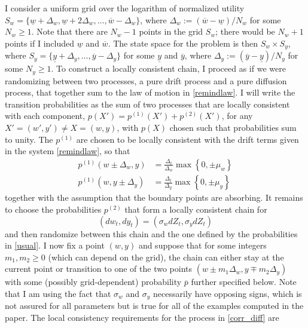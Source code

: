 \documentclass[11pt]{article}
\theoremstyle{plain}
\begin{document}

I consider a uniform grid over the logarithm of normalized utility $S_w = \{\underline{w} + \Delta_w, \underline{w} + 2\Delta_w, \dots, \overline{w} - \Delta_w\}$, where $\Delta_w := (\overline{w} - \underline{w})/N_w$ for some $N_w \geq 1$. Note that there are $N_w-1$ points in the grid $S_w$; there would be $N_w+1$ points if I included $\underline{w}$ and $\overline{w}$.
The state space for the problem is then $S_w \times S_y$, where $S_y = \{\underline{y} + \Delta_y, \dots, \overline{y} - \Delta_y\}$ for some $\underline{y}$ and $\overline{y}$, where $\Delta_y := (\overline{y} - \underline{y})/N_y$ for some $N_y \geq 1$. To construct a locally consistent chain, I proceed as if we were randomizing between two processes, a pure drift process and a pure diffusion process, that together sum to the law of motion in \eqref{remindlaw}. I will write the transition probabilities as the sum of two processes that are locally consistent with each component, $p(X') = p^{(1)}(X') + p^{(2)}(X')$, for any $X' = (w',y') \neq X = (w,y)$, with $p(X)$ chosen such that probabilities sum to unity. The $p^{(1)}$ are chosen to be locally consistent with the drift terms given in the system \eqref{remindlaw}, so that
\begin{equation}
\begin{aligned} 
p^{(1)}(w \pm \Delta_w, y) & = \frac{\Delta_t}{\Delta_w} \max{\left\{0, \pm \mu_w \right\}}
\\ p^{(1)}(w, y \pm \Delta_y) & = \frac{\Delta_t}{\Delta_y} \max{\left\{0, \pm \mu_y \right\}}
\end{aligned}
\label{usual}
\end{equation} %
together with the assumption that the boundary points are absorbing. It remains to choose the probabilities $p^{(2)}$ that form a locally consistent chain for %
\begin{equation}
(dw_t, dy_t) = (\sigma_w dZ_t, \sigma_y dZ_t)
\label{corr_diff}
\end{equation} 
and then randomize between this chain and the one defined by the probabilities in \eqref{usual}. I now fix a point $(w, y)$ and suppose that for some integers $m_1, m_2 \geq 0$ (which can depend on the grid), the chain can either stay at the current point or transition to one of the two points $(w \pm m_1\Delta_w, y \mp m_2\Delta_y)$ with some (possibly grid-dependent) probability $\overline{p}$ further specified below. Note that I am using the fact that $\sigma_w$ and $\sigma_y$ necessarily have opposing signs, which is not assured for all parameters but is true for all of the examples computed in the paper. The local consistency requirements for the process in \eqref{corr_diff} are
\end{document}
